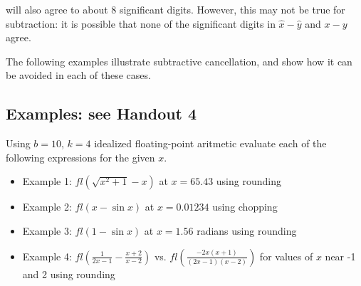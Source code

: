 \documentclass [titlepage,12pt,letter] {article}
\begin{document}
\noindent
will also agree to about 8 significant digits.  However, this may not be true for subtraction: it is possible that none of the significant digits in $\hat{x} - \hat{y}$ and $x - y$ agree. 

The following examples illustrate subtractive cancellation, and show how it can be avoided in each of these cases.

\subsection{Examples: see Handout 4}
Using $b=10$, $k=4$ idealized floating-point aritmetic evaluate each of the following expressions for the given $x$.
\begin{itemize}
\item{Example 1: $fl(\sqrt{x^2+1}-x)$ at $x = 65.43$ using rounding}
\item{Example 2: $fl(x - \sin{x})$ at $x=0.01234$ using chopping}
\item{Example 3: $fl(1-\sin{x})$ at $x=1.56$ radians using rounding}
\item{Example 4: $fl(\frac{1}{2x-1}-\frac{x+2}{x-2})$ vs. $fl(\frac{-2x(x+1)}{(2x-1)(x-2)})$ for values of $x$ near -1 and 2 using rounding}
\end{itemize} 


 
 
\end{document}
